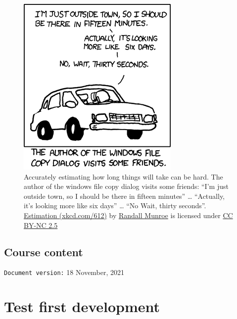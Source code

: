 \documentclass[
]{book}
\begin{document}
\begin{figure}

{\centering \includegraphics[width=0.75\linewidth]{images/xkcd-estimation} 

}

\caption{Accurately estimating how long things will take can be hard. The author of the windows file copy dialog visits some friends: ``I'm just outside town, so I should be there in fifteen minutes'' \ldots{} ``Actually, it's looking more like six days'' \ldots{} ``No Wait, thirty seconds''. \href{https://xkcd.com/612/}{Estimation (xkcd.com/612)} by \href{https://en.wikipedia.org/wiki/Randall_Munroe}{Randall Munroe} is licensed under \href{https://creativecommons.org/licenses/by-nc/2.5/}{CC BY-NC 2.5}}\label{fig:xkcd-estimation-fig}
\end{figure}



\hypertarget{course-content}{%
\section{Course content}\label{course-content}}

\texttt{Document\ version:} 18 November, 2021

\hypertarget{testing}{%
\chapter{Test first development}\label{testing}}
\end{document}
